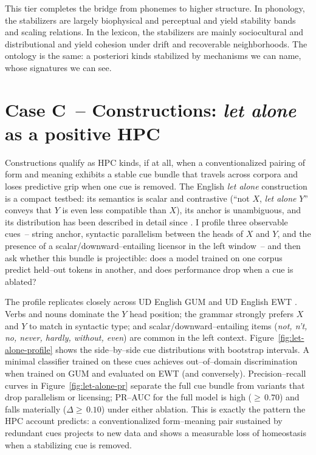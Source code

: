 \documentclass[12pt]{article}
\begin{document}
This tier completes the bridge from phonemes to higher structure. In phonology, the stabilizers are largely biophysical and perceptual and yield stability bands and scaling relations. In the lexicon, the stabilizers are mainly sociocultural and distributional and yield cohesion under drift and recoverable neighborhoods. The ontology is the same: a posteriori kinds stabilized by mechanisms we can name, whose signatures we can see.

\section{Case C~-- Constructions: \emph{let alone} as a positive HPC}\label{sec:case-construction}

Constructions qualify as HPC kinds, if at all, when a conventionalized pairing of form and meaning exhibits a stable cue bundle that travels across corpora and loses predictive grip when one cue is removed. The English \emph{let alone} construction is a compact testbed: its semantics is scalar and contrastive (``not $X$, \emph{let alone} $Y$'' conveys that $Y$ is even less compatible than $X$), its anchor is unambiguous, and its distribution has been described in detail since \citet{FillmoreKayOConnor1988}. I profile three observable cues~-- string anchor, syntactic parallelism between the heads of $X$ and $Y$, and the presence of a scalar/downward–entailing licensor in the left window~-- and then ask whether this bundle is projectible: does a model trained on one corpus predict held–out tokens in another, and does performance drop when a cue is ablated?

The profile replicates closely across UD English GUM \citep{Zeldes2017GUM} and UD English EWT \citep{Silveira2014EWT}. Verbs and nouns dominate the $Y$ head position; the grammar strongly prefers $X$ and $Y$ to match in syntactic type; and scalar/downward–entailing items (\emph{not, n’t, no, never, hardly, without, even}) are common in the left context. Figure~\ref{fig:let-alone-profile} shows the side–by–side cue distributions with bootstrap intervals. A minimal classifier trained on these cues achieves out–of–domain discrimination when trained on GUM and evaluated on EWT (and conversely). Precision–recall curves in Figure~\ref{fig:let-alone-pr} separate the full cue bundle from variants that drop parallelism or licensing; PR–AUC for the full model is high ($\geq\,0.70$) and falls materially ($\Delta\geq\,0.10$) under either ablation. This is exactly the pattern the \textsc{HPC} account predicts: a conventionalized form–meaning pair sustained by redundant cues projects to new data and shows a measurable loss of homeostasis when a stabilizing cue is removed.
\end{document}
